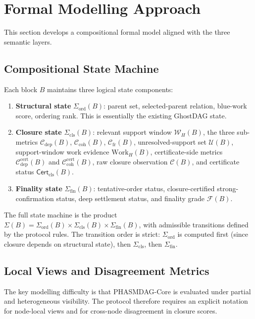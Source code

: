 \documentclass[11pt]{article}
\theoremstyle{definition}
\theoremstyle{plain}
\theoremstyle{remark}
\newcommand{\Clvl}{\mathcal{C}}          %
\newcommand{\Cdep}{\mathcal{C}_{\mathrm{dep}}}
\newcommand{\Ccoh}{\mathcal{C}_{\mathrm{coh}}}
\newcommand{\Cfr}{\mathcal{C}_{\mathrm{fr}}}
\newcommand{\Cdepcert}{\mathcal{C}^{\mathrm{cert}}_{\mathrm{dep}}}
\newcommand{\Ccohcert}{\mathcal{C}^{\mathrm{cert}}_{\mathrm{coh}}}
\newcommand{\Ffin}{\mathcal{F}}          %
\newcommand{\Certcls}{\mathsf{Cert}_{\mathrm{cls}}}
\begin{document}
\section{Formal Modelling Approach}\label{sec:formal}

This section develops a compositional formal model aligned with the three
semantic layers.

\subsection{Compositional State Machine}

Each block $B$ maintains three logical state components:

\begin{enumerate}[nosep]
    \item \textbf{Structural state} $\Sigma_{\mathrm{ord}}(B)$:
    parent set, selected-parent relation, blue-work score, ordering rank.
    This is essentially the existing GhostDAG state.

    \item \textbf{Closure state} $\Sigma_{\mathrm{cls}}(B)$:
    relevant support window $\mathcal{W}_H(B)$, the three sub-metrics
    $\Cdep(B)$, $\Ccoh(B)$, $\Cfr(B)$, unresolved-support set
    $\mathcal{U}(B)$, support-window work evidence $\mathrm{Work}_H(B)$,
    certificate-side metrics $\Cdepcert(B)$ and $\Ccohcert(B)$,
    raw closure observation $\Clvl(B)$, and certificate status $\Certcls(B)$.

    \item \textbf{Finality state} $\Sigma_{\mathrm{fin}}(B)$:
    tentative-order status, closure-certified strong-confirmation status, deep
    settlement status, and finality grade $\Ffin(B)$.
\end{enumerate}

The full state machine is the product
$\Sigma(B) = \Sigma_{\mathrm{ord}}(B) \times
\Sigma_{\mathrm{cls}}(B) \times \Sigma_{\mathrm{fin}}(B)$,
with admissible transitions defined by the protocol rules.
The transition order is strict: $\Sigma_{\mathrm{ord}}$ is computed first
(since closure depends on structural state), then $\Sigma_{\mathrm{cls}}$,
then $\Sigma_{\mathrm{fin}}$.

\subsection{Local Views and Disagreement Metrics}

The key modelling difficulty is that PHASMDAG-Core is evaluated under partial and
heterogeneous visibility.
The protocol therefore requires an explicit notation for node-local views and
for cross-node disagreement in closure scores.
\end{document}
